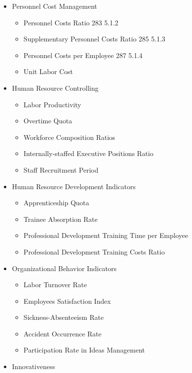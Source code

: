 \documentclass[]{book}
\providecommand{\tightlist}{%
  \setlength{\itemsep}{0pt}\setlength{\parskip}{0pt}}
\begin{document}
\begin{itemize}
\tightlist
\item
  Personnel Cost Management

  \begin{itemize}
  \tightlist
  \item
    Personnel Costs Ratio 283 5.1.2
  \item
    Supplementary Personnel Costs Ratio 285 5.1.3
  \item
    Personnel Costs per Employee 287 5.1.4
  \item
    Unit Labor Cost
  \end{itemize}
\item
  Human Resource Controlling

  \begin{itemize}
  \tightlist
  \item
    Labor Productivity
  \item
    Overtime Quota\\
  \item
    Workforce Composition Ratios\\
  \item
    Internally-staffed Executive Positions Ratio
  \item
    Staff Recruitment Period
  \end{itemize}
\item
  Human Resource Development Indicators

  \begin{itemize}
  \tightlist
  \item
    Apprenticeship Quota
  \item
    Trainee Absorption Rate
  \item
    Professional Development Training Time per Employee\\
  \item
    Professional Development Training Costs Ratio
  \end{itemize}
\item
  Organizational Behavior Indicators

  \begin{itemize}
  \tightlist
  \item
    Labor Turnover Rate\\
  \item
    Employees Satisfaction Index\\
  \item
    Sickness-Absenteeism Rate
  \item
    Accident Occurrence Rate\\
  \item
    Participation Rate in Ideas Management
  \end{itemize}
\item
  Innovativeness


\end{itemize}
\end{document}
